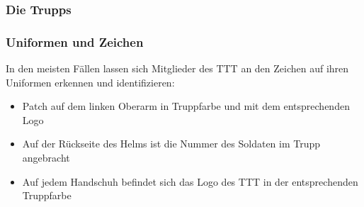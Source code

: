 \subsubsection{Die Trupps}
\subsubsection{Uniformen und Zeichen}
In den meisten Fällen lassen sich Mitglieder des TTT an den Zeichen auf ihren Uniformen erkennen und identifizieren:
\begin{itemize}
	\item Patch auf dem linken Oberarm in Truppfarbe und mit dem entsprechenden Logo
	\item Auf der Rückseite des Helms ist die Nummer des Soldaten im Trupp angebracht
	\item Auf jedem Handschuh befindet sich das Logo des TTT in der entsprechenden Truppfarbe
\end{itemize}

